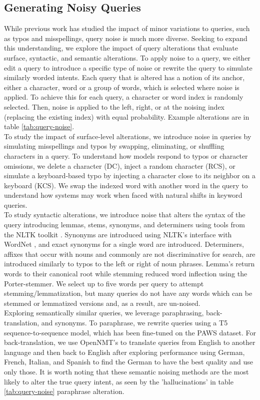 \subsection{Generating Noisy Queries}
\label{sec:making-noise}
While previous work has studied the impact of minor variations to queries, such as typos and misspellings, query noise is much more diverse. Seeking to expand this understanding, we explore the impact of query alterations that evaluate surface, syntactic, and semantic alterations. To apply noise to a query, we either edit a query to introduce a specific type of noise or rewrite the query to simulate similarly worded intents. Each query that is altered has a notion of its anchor, either a character, word or a group of words, which is selected where noise is applied. To achieve this for each query, a character or word index is randomly selected. Then, noise is applied to the left, right, or at the noising index (replacing the existing index) with equal probability. Example alterations are in table \ref{tab:query-noise}. \\
To study the impact of surface-level alterations, we introduce noise in queries by simulating misspellings and typos by swapping, eliminating, or shuffling characters in a query. To understand how models respond to typos or character omissions, we delete a character (DC), inject a random character (RCS), or simulate a keyboard-based typo by injecting a character close to its neighbor on a keyboard (KCS). We swap the indexed word with another word in the query to understand how systems may work when faced with natural shifts in keyword queries. \\
To study syntactic alterations, we introduce noise that alters the syntax of the query introducing lemmas, stems, synonyms, and determiners using tools from the NLTK toolkit \cite{bird2009natural}. Synonyms are introduced using NLTK's interface with WordNet \cite{Fellbaum2000WordNetA}, and exact synonyms for a single word are introduced.  Determiners, affixes that occur with nouns and commonly are not discriminative for search, are introduced similarly to typos to the left or right of noun phrases. Lemma's return words to their canonical root while stemming reduced word inflection using the Porter-stemmer. We select up to five words per query to attempt stemming/lemmatization, but many queries do not have any words which can be stemmed or lemmatized versions and, as a result, are un-noised. \\
Exploring semantically similar queries, we leverage paraphrasing, back-translation, and synonyms. To paraphrase, we rewrite queries using a T5 \cite{Raffel2020ExploringTL} sequence-to-sequence model, which has been fine-tuned on the PAWS \cite{Zhang2019PAWSPA} dataset. For back-translation, we use OpenNMT's \cite{klein-etal-2017-opennmt} to translate queries from English to another language and then back to English after exploring performance using German, French, Italian, and Spanish to find the German to have the best quality and use only those. It is worth noting that these semantic noising methods are the most likely to alter the true query intent, as seen by the 'hallucinations' in table \ref{tab:query-noise} paraphrase alteration. \\
